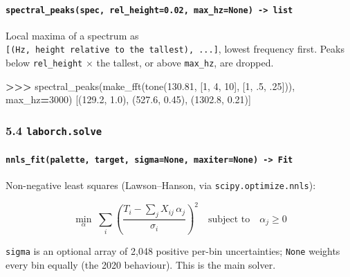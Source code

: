 \documentclass[
  10pt,
]{article}
\newenvironment{Shaded}{\begin{snugshade}}{\end{snugshade}}
\newcommand{\DecValTok}[1]{\textcolor[rgb]{0.00,0.00,0.81}{#1}}
\newcommand{\FloatTok}[1]{\textcolor[rgb]{0.00,0.00,0.81}{#1}}
\newcommand{\NormalTok}[1]{#1}
\newcommand{\OperatorTok}[1]{\textcolor[rgb]{0.81,0.36,0.00}{\textbf{#1}}}
\begin{document}
\paragraph{\texorpdfstring{\texttt{spectral\_peaks(spec,\ rel\_height=0.02,\ max\_hz=None)\ -\textgreater{}\ list}}{spectral\_peaks(spec, rel\_height=0.02, max\_hz=None) -\textgreater{} list}}

Local maxima of a spectrum as
\texttt{{[}(Hz,\ height\ relative\ to\ the\ tallest),\ ...{]}},
lowest frequency first. Peaks below \texttt{rel\_height} $\times$
the tallest, or above \texttt{max\_hz}, are dropped.

\begin{Shaded}
\begin{Highlighting}[]
\OperatorTok{\textgreater{}\textgreater{}\textgreater{}}\NormalTok{ spectral\_peaks(make\_fft(tone(}\FloatTok{130.81}\NormalTok{, [}\DecValTok{1}\NormalTok{, }\DecValTok{4}\NormalTok{, }\DecValTok{10}\NormalTok{], [}\DecValTok{1}\NormalTok{, }\FloatTok{.5}\NormalTok{, }\FloatTok{.25}\NormalTok{])), max\_hz}\OperatorTok{=}\DecValTok{3000}\NormalTok{)}
\NormalTok{[(}\FloatTok{129.2}\NormalTok{, }\FloatTok{1.0}\NormalTok{), (}\FloatTok{527.6}\NormalTok{, }\FloatTok{0.45}\NormalTok{), (}\FloatTok{1302.8}\NormalTok{, }\FloatTok{0.21}\NormalTok{)]}
\end{Highlighting}
\end{Shaded}

\subsubsection{\texorpdfstring{5.4
\texttt{laborch.solve}}{5.4 laborch.solve}}

\paragraph{\texorpdfstring{\texttt{nnls\_fit(palette,\ target,\ sigma=None,\ maxiter=None)\ -\textgreater{}\ Fit}}{nnls\_fit(palette, target, sigma=None, maxiter=None) -\textgreater{} Fit}}

Non-negative least squares (Lawson--Hanson, via
\texttt{scipy.optimize.nnls}):

\[
  \min_{\alpha}\; \sum_i \left( \frac{T_i - \sum_j X_{ij}\,\alpha_j}{\sigma_i} \right)^{2}
  \quad \text{subject to} \quad \alpha_j \ge 0
\]

\texttt{sigma} is an optional array of 2,048 positive
per-bin uncertainties; \texttt{None} weights every bin
equally (the 2020 behaviour). This is the main solver.
\end{document}
